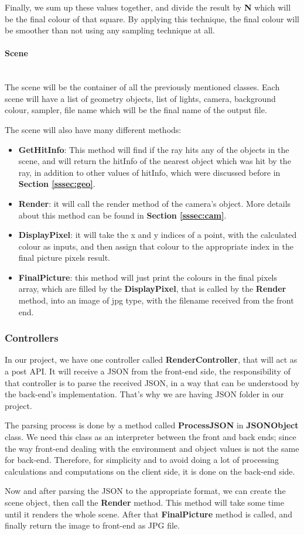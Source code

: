 \documentclass[a4paper]{article}
\newcommand{
	\subsubsubsection}[1]
{\paragraph{#1}\mbox{}\\[.35em]}
\begin{document}
	\par Finally, we sum up these values together, and divide the result by \textbf{N} which will be the final colour of that square. By applying this technique, the final colour will be smoother than not using any sampling technique at all.
	\subsubsubsection{Scene}
	The scene will be the container of all the previously mentioned classes. Each scene will have a list of geometry objects, list of lights, camera, background colour, sampler, file name which will be the final name of the output file.\\
	\par The scene will also have many different methods:
	\begin{itemize}
		\item \textbf{GetHitInfo}: This method will find if the ray hits any of the objects in the scene, and will return the hitInfo of the nearest object which was hit by the ray, in addition to other values of hitInfo, which were discussed before in \textbf{Section \ref{sssec:geo}}.
		\item \textbf{Render}: it will call the render method of the camera's object. More details about this method can be found in \textbf{Section \ref{sssec:cam}}.
		\item \textbf{DisplayPixel}: it will take the x and y indices of a point, with the calculated colour as inputs, and then assign that colour to the appropriate index in the final picture pixels result.
		\item \textbf{FinalPicture}: this method will just print the colours in the final pixels array, which are filled by the \textbf{DisplayPixel}, that is called by the \textbf{Render} method, into an image of jpg type, with the filename received from the front end.
	\end{itemize}
	\subsubsection{Controllers}
	In our project, we have one controller called \textbf{RenderController}, that will act as a post API. It will receive a JSON from the front-end side, the responsibility of that controller is to parse the received JSON, in a way that can be understood by the back-end's implementation. That's why we are having JSON folder in our project.\\
	\par The parsing process is done by a method called \textbf{ProcessJSON} in \textbf{JSONObject} class. We need this class as an interpreter between the front and back ends; since the way front-end dealing with the environment and object values is not the same for back-end. Therefore, for simplicity and to avoid doing a lot of processing calculations and computations on the client side, it is done on the back-end side.
	\par Now and after parsing the JSON to the appropriate format, we can create the scene object, then call the \textbf{Render} method. This method will take some time until it renders the whole scene. After that \textbf{FinalPicture} method is called, and finally return the image to front-end as JPG file.
\end{document}
